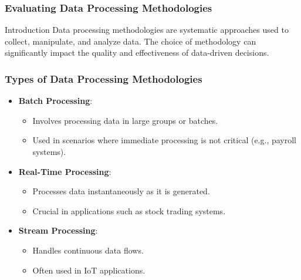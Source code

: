 \documentclass[aspectratio=169]{beamer}
\begin{document}
\begin{frame}[fragile]
    \frametitle{Evaluating Data Processing Methodologies}
    \begin{block}{Introduction}
        Data processing methodologies are systematic approaches used to collect, manipulate, and analyze data. The choice of methodology can significantly impact the quality and effectiveness of data-driven decisions.
    \end{block}
\end{frame}

\begin{frame}[fragile]
    \frametitle{Types of Data Processing Methodologies}
    \begin{itemize}
        \item \textbf{Batch Processing}: 
            \begin{itemize}
                \item Involves processing data in large groups or batches.
                \item Used in scenarios where immediate processing is not critical (e.g., payroll systems).
            \end{itemize}
        
        \item \textbf{Real-Time Processing}: 
            \begin{itemize}
                \item Processes data instantaneously as it is generated.
                \item Crucial in applications such as stock trading systems.
            \end{itemize}
        
        \item \textbf{Stream Processing}: 
            \begin{itemize}
                \item Handles continuous data flows.
                \item Often used in IoT applications.
            \end{itemize}
    \end{itemize}
\end{frame}
\end{document}
